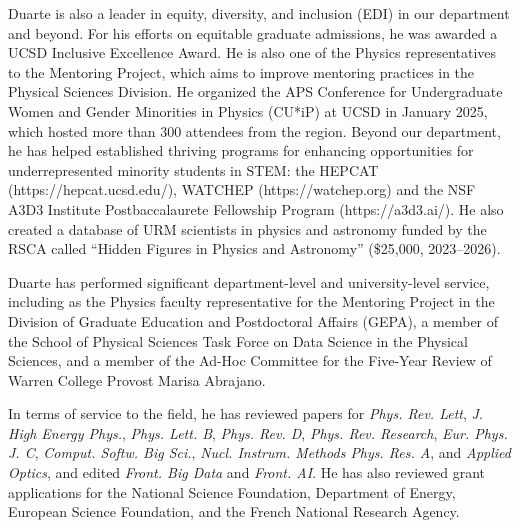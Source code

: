 \documentclass[11pt]{article}
\begin{document}
Duarte is also a leader in equity, diversity, and inclusion (EDI) in our department and beyond.
For his efforts on equitable graduate admissions, he was awarded a UCSD Inclusive Excellence Award.
He is also one of the Physics representatives to the Mentoring Project, which aims to improve mentoring practices in the Physical Sciences Division.
He organized the APS Conference for Undergraduate Women and Gender Minorities in Physics (CU*iP) at UCSD in January 2025, which hosted more than 300 attendees from the region.
Beyond our department, he has helped established thriving programs for enhancing opportunities for underrepresented minority students in STEM: the HEPCAT (https://hepcat.ucsd.edu/), WATCHEP (https://watchep.org) and the NSF A3D3 Institute Postbaccalaurete Fellowship Program (https://a3d3.ai/).
He also created a database of URM scientists in physics and astronomy funded by the RSCA called ``Hidden Figures in Physics and Astronomy'' (\$25,000, 2023--2026).

Duarte has performed significant department-level and university-level service, including as the Physics faculty representative for the Mentoring Project in the Division of Graduate Education and Postdoctoral Affairs (GEPA), a member of the School of Physical Sciences Task Force on Data Science in the Physical Sciences, and a member of the Ad-Hoc Committee for the Five-Year Review of Warren College Provost Marisa Abrajano.

In terms of service to the field, he has reviewed papers for \emph{Phys. Rev. Lett}, \emph{J. High Energy Phys.}, \emph{Phys. Lett. B}, \emph{Phys. Rev. D}, \emph{Phys. Rev. Research}, \emph{Eur. Phys. J. C}, \emph{Comput. Softw. Big Sci.}, \emph{Nucl. Instrum. Methods Phys. Res. A}, and \emph{Applied Optics}, and edited \emph{Front. Big Data} and \emph{Front. AI}.
He has also reviewed grant applications for the National Science Foundation, Department of Energy, European Science Foundation, and the French National Research Agency.
\end{document}
